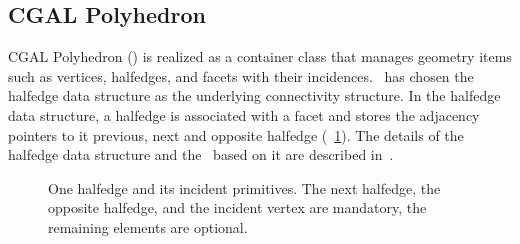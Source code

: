\subsection{CGAL Polyhedron}

CGAL Polyhedron (\cgalpoly) is realized as a container class 
that manages geometry items such as vertices, halfedges, and 
facets with their incidences.  \cgalpoly\ has chosen the 
halfedge data structure as the underlying connectivity 
structure. In the halfedge data structure, a halfedge is 
associated with a facet and stores the adjacency pointers 
to it previous, next and opposite halfedge (\figurename\ \ref{fig:halfedge}). 
The details of the halfedge data structure and the \cgalpoly\ based 
on it are described in~\cite{k-ugpdd-99}.

\begin{figure}[h]
    \caption{One halfedge and its incident primitives. The next
      halfedge, the opposite halfedge, and the incident vertex are
      mandatory, the remaining elements are optional.
    }
    \label{fig:halfedge}
\end{figure}

